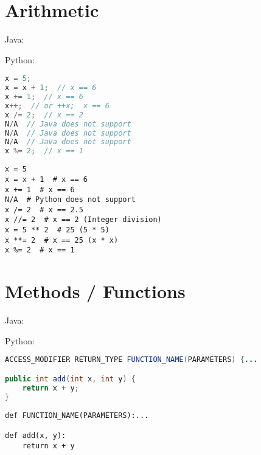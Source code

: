 \documentclass{article}
\begin{document}
\section{Arithmetic}
\begin{minipage}{0.45\linewidth}
    Java:
\end{minipage}
\hfill
\begin{minipage}{0.45\linewidth}
    Python:
\end{minipage}

\begin{minipage}{0.45\linewidth}
    \begin{lstlisting}[language=Java]
x = 5;
x = x + 1;  // x == 6
x += 1;  // x == 6
x++;  // or ++x;  x == 6
x /= 2;  // x == 2
N/A  // Java does not support
N/A  // Java does not support
N/A  // Java does not support
x %= 2;  // x == 1
    \end{lstlisting}
\end{minipage}
\hfill
\begin{minipage}{0.45\linewidth}
    \begin{lstlisting}
x = 5
x = x + 1  # x == 6
x += 1  # x == 6
N/A  # Python does not support
x /= 2  # x == 2.5
x //= 2  # x == 2 (Integer division)
x = 5 ** 2  # 25 (5 * 5)
x **= 2  # x == 25 (x * x)
x %= 2  # x == 1
    \end{lstlisting}
\end{minipage}

\section{Methods / Functions}
\begin{minipage}{0.45\linewidth}
    Java:
\end{minipage}
\hfill
\begin{minipage}{0.45\linewidth}
    Python:
\end{minipage}

\begin{minipage}{0.45\linewidth}
    \begin{lstlisting}[language=Java]
ACCESS_MODIFIER RETURN_TYPE FUNCTION_NAME(PARAMETERS) {...

public int add(int x, int y) {
    return x + y;
}
    \end{lstlisting}
\end{minipage}
\hfill
\begin{minipage}{0.45\linewidth}
    \begin{lstlisting}
def FUNCTION_NAME(PARAMETERS):...

def add(x, y):
    return x + y
    \end{lstlisting}
\end{minipage}
\end{document}
